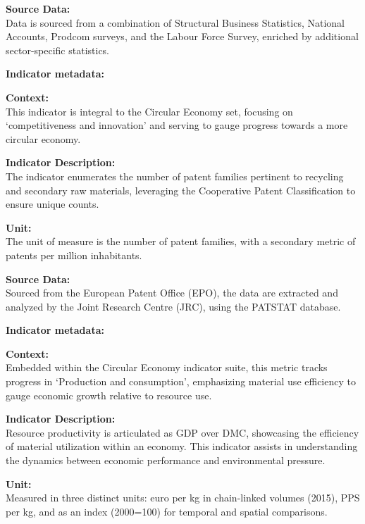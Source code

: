 {\large\textbf{Source Data:}}  \\ \indent
Data is sourced from a combination of Structural Business Statistics, National Accounts, Prodcom surveys, and the Labour Force Survey, enriched by additional sector-specific statistics.

\textbf{Indicator metadata:}   \href{https://ec.europa.eu/eurostat/cache/metadata/en/cei_cie020_esmsip2.htm}{\faExternalLink}

{\large\textbf{Context:}}  \\ \indent
This indicator is integral to the Circular Economy set, focusing on `competitiveness and innovation' and serving to gauge progress towards a more circular economy.

{\large\textbf{Indicator Description:}}  \\ \indent
The indicator enumerates the number of patent families pertinent to recycling and secondary raw materials, leveraging the Cooperative Patent Classification to ensure unique counts.

{\large\textbf{Unit:}}  \\ \indent
The unit of measure is the number of patent families, with a secondary metric of patents per million inhabitants.

{\large\textbf{Source Data:}}  \\ \indent
Sourced from the European Patent Office (EPO), the data are extracted and analyzed by the Joint Research Centre (JRC), using the PATSTAT database.

\textbf{Indicator metadata:}   \href{https://ec.europa.eu/eurostat/cache/metadata/en/cei_pc030_esmsip2.htm}{\faExternalLink}

{\large\textbf{Context:}} \\
Embedded within the Circular Economy indicator suite, this metric tracks progress in `Production and consumption', emphasizing material use efficiency to gauge economic growth relative to resource use.

{\large\textbf{Indicator Description:}}  \\ \indent
Resource productivity is articulated as GDP over DMC, showcasing the efficiency of material utilization within an economy. This indicator assists in understanding the dynamics between economic performance and environmental pressure.

{\large\textbf{Unit:}}  \\ \indent
Measured in three distinct units: euro per kg in chain-linked volumes (2015), PPS per kg, and as an index (2000=100) for temporal and spatial comparisons.

